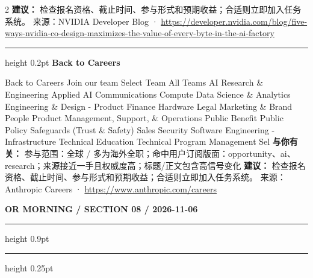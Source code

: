 \documentclass[10.5pt]{ctexart}
\begin{document}
\begin{multicols}{2}
\textbf{建议：} 检查报名资格、截止时间、参与形式和预期收益；合适则立即加入任务系统。
{\footnotesize\color{ormuted} 来源：NVIDIA Developer Blog · \url{https://developer.nvidia.com/blog/five-ways-nvidia-co-design-maximizes-the-value-of-every-byte-in-the-ai-factory}}
\vspace{2mm}
\hrule height 0.2pt
\vspace{2mm}
{\large\bfseries Back to Careers}\par
Back to Careers Join our team Select Team All Teams AI Research \& Engineering Applied AI Communications Compute Data Science \& Analytics Engineering \& Design - Product Finance Hardware Legal Marketing \& Brand People Product Management, Support, \& Operations Public Benefit Public Policy Safeguards (Trust \& Safety) Sales Security Software Engineering - Infrastructure Technical Education Technical Program Management Sel
\textbf{与你有关：} 参与范围：全球 / 多为海外全职；命中用户订阅版面：opportunity、ai、research；来源接近一手且权威度高；标题/正文包含高信号变化
\textbf{建议：} 检查报名资格、截止时间、参与形式和预期收益；合适则立即加入任务系统。
{\footnotesize\color{ormuted} 来源：Anthropic Careers · \url{https://www.anthropic.com/careers}}
\end{multicols}
\newpage
{\small\bfseries OR MORNING / SECTION 08 / 2026-11-06}
\vspace{2mm}
\hrule height 0.9pt
\vspace{1.5mm}
\hrule height 0.25pt
\vspace{4mm}
\end{document}
